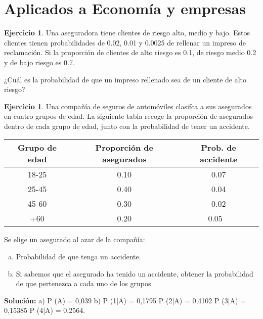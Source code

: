 \documentclass[]{article}
\theoremstyle{plain}
\theoremstyle{definition}
\newtheorem{exercise}[theorem]{Ejercicio}
\theoremstyle{definition} %
\begin{document}
\section{Aplicados a Economía y empresas}
\begin{exercise}
    Una aseguradora tiene clientes de riesgo alto, medio y bajo. Estos
clientes tienen probabilidades de 0.02, 0.01 y 0.0025 de rellenar un
impreso de reclamación. Si la proporción de clientes de alto riesgo
es 0.1, de riesgo medio 0.2 y de bajo riesgo es 0.7.

¿Cuál es la probabilidad de que un impreso rellenado sea de un
cliente de alto riesgo?
\end{exercise}


\begin{exercise}
    Una compañía de seguros de automóviles clasifca a sus asegurados
    en cuatro grupos de edad. La siguiente tabla recoge la proporción de
    asegurados dentro de cada grupo de edad, junto con la probabilidad
    de tener un accidente.

    \begin{center}
        \begin{tabular}{ccc}
            Grupo de edad &Proporción de asegurados &Prob. de accidente \\  
            \hline              
            18-25         &0.10                     &0.07               \\  
            25-45         &0.40                     &0.04               \\  
            45-60         &0.30                     &0.02               \\  
            +60           &0.20                     &0.05               \
        \end{tabular}
    \end{center}
    Se elige un asegurado al azar de la compañía:
    \begin{enumerate}[a)]
        \item Probabilidad de que tenga un accidente.
        \item Si sabemos que el asegurado ha tenido un accidente, obtener la
        probabilidad de que pertenezca a cada uno de los grupos.
    \end{enumerate}
    \textbf{Solución:}
    a) P (A) = 0,039 b) P (1|A) = 0,1795 P (2|A) = 0,4102 P (3|A) =
    0,15385 P (4|A) = 0,2564.
\end{exercise}
\end{document}
